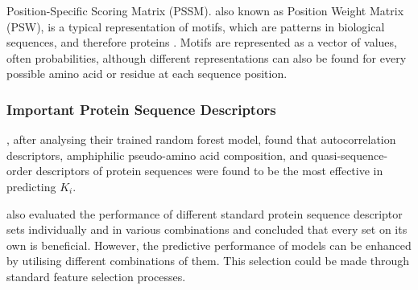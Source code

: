 Position-Specific Scoring Matrix (PSSM). also known as Position Weight Matrix (PSW), is a typical representation of motifs, which are patterns in biological sequences, and therefore proteins \citep{Jiang2020, Encyclopedia}. Motifs are represented as a vector of values, often probabilities, although different representations can also be found for every possible amino acid or residue at each sequence position. 

\subsubsection{Important Protein Sequence Descriptors}
\label{subsubsec:Important_Protein_Sequence_Descriptors}

\citet{Shar2016}, after analysing their trained random forest model, found that autocorrelation descriptors, amphiphilic pseudo-amino acid composition, and quasi-sequence-order descriptors of protein sequences were found to be the most effective in predicting $K_i$. 

\citet{Ong2007} also evaluated the performance of different standard protein sequence descriptor sets individually and in various combinations and concluded that every set on its own is beneficial. However, the predictive performance of models can be enhanced by utilising different combinations of them. This selection could be made through standard feature selection processes.